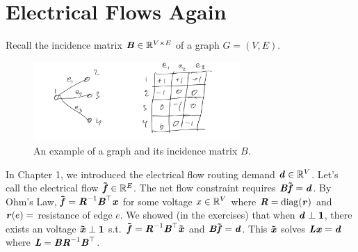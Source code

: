 \section{Electrical Flows Again}
Recall the incidence matrix $\BB\in\R^{V\times E}$ of a graph
$G=(V,E)$.

\begin{figure}[H]
  \centering
  \includegraphics[width=0.7\textwidth]{fig/lecture6_incidence-example.jpeg}
  \caption{An example of a graph and its incidence matrix $B$.}
\label{fig:incidenceexample}
\end{figure}

In Chapter 1, we introduced the electrical flow routing  demand
$\dd\in\R^V$.
Let's call the electrical flow $\fftil\in\R^E$. The net flow
constraint requires $\BB\fftil = \dd$. By Ohm's Law,
$\fftil=\RR^{-1}\BB^\trp\xx$ for some voltage $x\in\R^V$ where
$\RR=\diag(\rr)$ and $\rr(e)=$ resistance of edge $e$. We showed (in
the exercises) that when $\dd \perp \matone$, there exists an voltage
$\xxtil\perp\matone$ s.t.\ $\fftil=\RR^{-1}\BB^\trp\xxtil$ and
$\BB\fftil = \dd$. This $\xxtil$ solves $\LL\xx=\dd$ where
$\LL=\BB\RR^{-1}\BB^\trp$.

